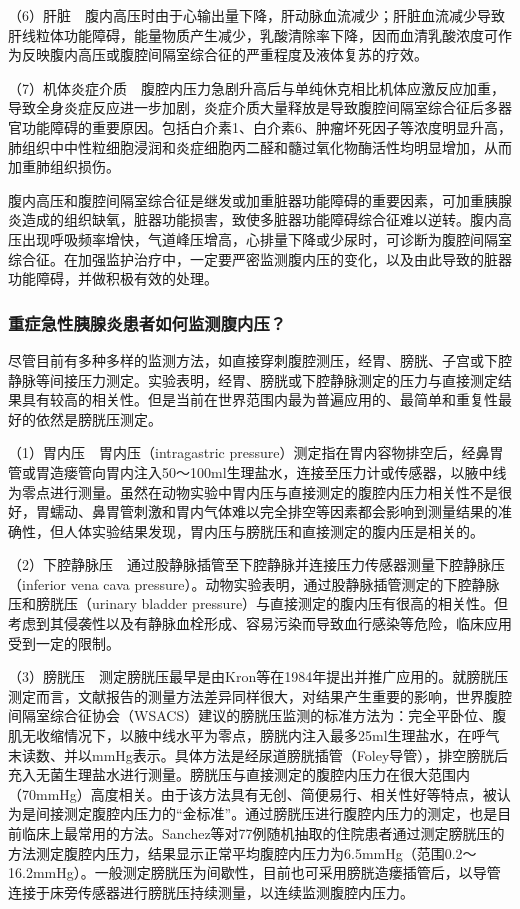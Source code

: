 （6）肝脏　腹内高压时由于心输出量下降，肝动脉血流减少；肝脏血流减少导致肝线粒体功能障碍，能量物质产生减少，乳酸清除率下降，因而血清乳酸浓度可作为反映腹内高压或腹腔间隔室综合征的严重程度及液体复苏的疗效。

（7）机体炎症介质　腹腔内压力急剧升高后与单纯休克相比机体应激反应加重，导致全身炎症反应进一步加剧，炎症介质大量释放是导致腹腔间隔室综合征后多器官功能障碍的重要原因。包括白介素1、白介素6、肿瘤坏死因子等浓度明显升高，肺组织中中性粒细胞浸润和炎症细胞丙二醛和髓过氧化物酶活性均明显增加，从而加重肺组织损伤。

腹内高压和腹腔间隔室综合征是继发或加重脏器功能障碍的重要因素，可加重胰腺炎造成的组织缺氧，脏器功能损害，致使多脏器功能障碍综合征难以逆转。腹内高压出现呼吸频率增快，气道峰压增高，心排量下降或少尿时，可诊断为腹腔间隔室综合征。在加强监护治疗中，一定要严密监测腹内压的变化，以及由此导致的脏器功能障碍，并做积极有效的处理。

\subsubsection{重症急性胰腺炎患者如何监测腹内压？}

尽管目前有多种多样的监测方法，如直接穿刺腹腔测压，经胃、膀胱、子宫或下腔静脉等间接压力测定。实验表明，经胃、膀胱或下腔静脉测定的压力与直接测定结果具有较高的相关性。但是当前在世界范围内最为普遍应用的、最简单和重复性最好的依然是膀胱压测定。

（1）胃内压　胃内压（intragastric
pressure）测定指在胃内容物排空后，经鼻胃管或胃造瘘管向胃内注入50～100ml生理盐水，连接至压力计或传感器，以腋中线为零点进行测量。虽然在动物实验中胃内压与直接测定的腹腔内压力相关性不是很好，胃蠕动、鼻胃管刺激和胃内气体难以完全排空等因素都会影响到测量结果的准确性，但人体实验结果发现，胃内压与膀胱压和直接测定的腹内压是相关的。

（2）下腔静脉压　通过股静脉插管至下腔静脉并连接压力传感器测量下腔静脉压（inferior
vena cava
pressure）。动物实验表明，通过股静脉插管测定的下腔静脉压和膀胱压（urinary
bladder
pressure）与直接测定的腹内压有很高的相关性。但考虑到其侵袭性以及有静脉血栓形成、容易污染而导致血行感染等危险，临床应用受到一定的限制。

（3）膀胱压　测定膀胱压最早是由Kron等在1984年提出并推广应用的。就膀胱压测定而言，文献报告的测量方法差异同样很大，对结果产生重要的影响，世界腹腔间隔室综合征协会（WSACS）建议的膀胱压监测的标准方法为：完全平卧位、腹肌无收缩情况下，以腋中线水平为零点，膀胱内注入最多25ml生理盐水，在呼气末读数、并以mmHg表示。具体方法是经尿道膀胱插管（Foley导管），排空膀胱后充入无菌生理盐水进行测量。膀胱压与直接测定的腹腔内压力在很大范围内（70mmHg）高度相关。由于该方法具有无创、简便易行、相关性好等特点，被认为是间接测定腹腔内压力的“金标准”。通过膀胱压进行腹腔内压力的测定，也是目前临床上最常用的方法。Sanchez等对77例随机抽取的住院患者通过测定膀胱压的方法测定腹腔内压力，结果显示正常平均腹腔内压力为6.5mmHg（范围0.2～16.2mmHg）。一般测定膀胱压为间歇性，目前也可采用膀胱造瘘插管后，以导管连接于床旁传感器进行膀胱压持续测量，以连续监测腹腔内压力。


